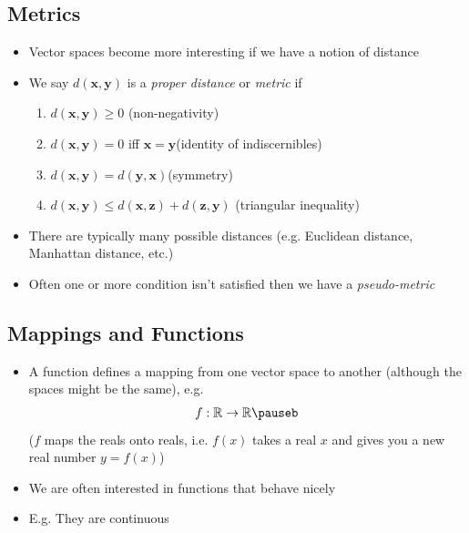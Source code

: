 \begin{slide}
\section[-1]{Metrics}

\begin{PauseHighLight}
  \begin{itemize}
  \item Vector spaces become more interesting if we have a notion of distance\pause
  \item We say $d(\bm{x}, \bm{y})$ is a \emph{proper distance} or \emph{metric} if
    \begin{enumerate}\squeeze
    \item $d(\bm{x}, \bm{y}) \geq 0$ \hfill (non-negativity)\pause
    \item $d(\bm{x}, \bm{y}) = 0$ iff $\bm{x} =\bm{y}$\hfill  (identity
      of indiscernibles)\pause
    \item $d(\bm{x}, \bm{y}) = d(\bm{y}, \bm{x})$\hfill (symmetry)\pause
    \item $d(\bm{x}, \bm{y}) \leq d(\bm{x}, \bm{z}) +d(\bm{z}, \bm{y})$
      \hfill(triangular inequality)\pause
    \end{enumerate}
  \item There are typically many possible distances (e.g. Euclidean
    distance, Manhattan distance, etc.)\pause
  \item Often one or more condition isn't satisfied then we have a
    \emph{pseudo-metric}\pause
  \end{itemize}
\end{PauseHighLight}

\end{slide}


\begin{slide}
\section{Mappings and Functions}

\begin{PauseHighLight}
  \begin{itemize}
  \item A function defines a mapping from one vector space to another
    (although the spaces might be the same)\pause, e.g.
    \begin{align*}
      f: \mathbb{R} \rightarrow \mathbb{R}\pauseb
    \end{align*}
    ($f$ maps the reals onto reals, i.e. $f(x)$ takes a real $x$ and
    gives you a new real number $y=f(x)$)\pauseb
  \item We are often interested in functions that behave nicely\pauseb
  \item E.g. They are continuous\pauseb
  \end{itemize}
\end{PauseHighLight}

\end{slide}

